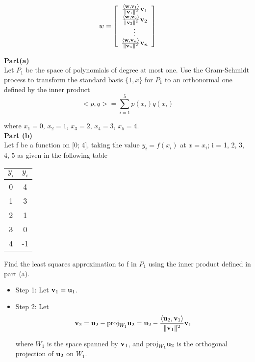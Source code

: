 \documentclass[12pt, a4paper]{report}
\theoremstyle{plain}
\theoremstyle{definition}
\theoremstyle{remark}
\begin{document}
{{\[ w= \left[ \begin{array}{c}
				\frac{\langle {\bf w},{\bf v}_1\rangle}{\| {\bf v}_1 \|^{2}}{\bf v}_1\\
				\frac{\langle {\bf w},{\bf v}_2\rangle}{\| {\bf v}_2 \|^{2}}{\bf v}_2\\
				\vdots\\
				\frac{\langle {\bf w},{\bf v}_n\rangle}{\| {\bf v}_n \|^{2}}{\bf v}_n
			\end{array} \right] \]
			
}	
\newpage
{
\Large
\noindent \textbf{Part(a)} \\
Let $P_1$ be the space of polynomials of degree at most one. Use the
Gram-Schmidt process to transform the standard basis $\{1, x\}$ for $P_1$
to an orthonormal one defined by the inner product
\[ <p,q> = \sum_{i=1}^{5} p(x_i)q(x_i) \]


where $x_1 = 0$, $x_2 = 1$, $x_3 = 2$, $x_4 = 3$, $x_5 = 4$.\\
\bigskip
\textbf{Part (b)} \\
 Let f be a function on [0; 4], taking the value $y_i = f(x_i)$ at $x = x_i$; i =
1, 2, 3, 4, 5 as given in the following table
\begin{center}
\begin{tabular}{|c|c|}
\hline  $y_i$ & $y_i$  \\
\hline \hline  0 & 4  \\
\hline  1 & 3  \\
\hline  2 & 1  \\
\hline  3 & 0  \\
\hline  4 &-1  \\
\hline
\end{tabular}
\end{center}


Find the least squares approximation to f in $P_1$ using the inner product
defined in part (a).
}
\newpage
{\Large
\begin{itemize}
\item Step 1: Let ${\bf v}_1 = {\bf u}_1$.	
			

\item Step 2: Let \[ {\bf v}_2={\bf u}_2 - \mbox{proj}_{W_{1}}{\bf
		u}_2 = {\bf u}_2 - \frac{\langle {\bf u}_2,{\bf v}_1\rangle}{\| {\bf v}_1 \|^{2}}{\bf v}_1\]
		
		where $W_1$ is the space spanned by ${\bf v}_1$, and
		$\mbox{proj}_{W_{1}}{\bf u}_2$ is the orthogonal projection of ${\bf
		u}_2$ on $W_1$.


\end{itemize}}}
\end{document}
